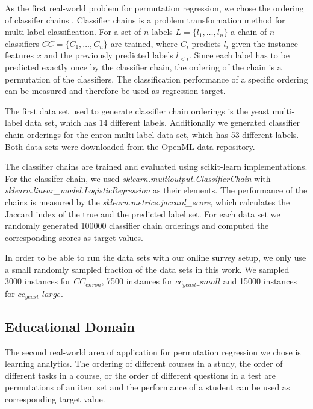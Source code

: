 As the first real-world problem for permutation regression, we chose the ordering of classifer chains \cite{classifierchains}. Classifier chains is a problem transformation method for multi-label classification. For a set of $n$ labels $L = \{l_1, \dots, l_n \}$ a chain of $n$ classifiers $CC = \{C_1, \dots, C_n \}$ are trained, where $C_i$ predicts $l_i$ given the instance features $x$ and the previously predicted labels $l_{<i}$. Since each label has to be predicted exactly once by the classifier chain, the ordering of the chain is a permutation of the classifiers. The classification performance of a specific ordering can be measured and therefore be used as regression target.


The first data set used to generate classifier chain orderings is the yeast  \cite{yeast} multi-label data set, which has 14 different labels. Additionally we generated classifier chain orderings for the enron \cite{enron} multi-label data set, which has 53 different labels. Both data sets were downloaded from the OpenML \cite{openml} data repository.


The classifier chains are trained and evaluated using scikit-learn \cite{scikit-learn} implementations. For the classifer chain, we used \textit{sklearn.multioutput.ClassifierChain} with \textit{sklearn.linear\_model.LogisticRegression} as their elements. The performance of the chains is measured by the \textit{sklearn.metrics.jaccard\_score}, which calculates the Jaccard index \cite{jaccard} of the true and the predicted label set. For each data set we randomly generated 100000 classifier chain orderings and computed the corresponding scores as target values.

In order to be able to run the data sets with our online survey setup, we only use a small randomly sampled fraction of the data sets in this work. We sampled 3000 instances for $CC_{enron}$, 7500 instances for $cc_{yeast}\_small$ and 15000 instances for $cc_{yeast}\_large$.



\subsection{Educational Domain}

The second real-world area of application for permutation regression we chose is learning analytics. The ordering of different courses in a study, the order of different tasks in a course, or the order of different questions in a test are permutations of an item set and the performance of a student can be used as corresponding target value.



